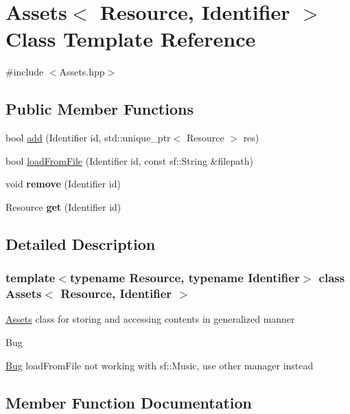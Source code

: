\hypertarget{class_assets}{}\section{Assets$<$ Resource, Identifier $>$ Class Template Reference}
\label{class_assets}


{\ttfamily \#include $<$Assets.\+hpp$>$}

\subsection*{Public Member Functions}
\begin{DoxyCompactItemize}
\item 
bool \hyperlink{class_assets_a4f68c4062a79168c95daf5189a0fc66d}{add} (Identifier id, std\+::unique\+\_\+ptr$<$ Resource $>$ res)
\item 
bool \hyperlink{class_assets_a49e8d7a2a71566ce3ec1186666274a9a}{load\+From\+File} (Identifier id, const sf\+::\+String \&filepath)
\item 
\mbox{\label{class_assets_a89254b23f0e1477aae4bbb99d76e85cb}} 
void {\bfseries remove} (Identifier id)
\item 
\mbox{\label{class_assets_a02f50a66b90b8c154d1613be25fdfe43}} 
Resource {\bfseries get} (Identifier id)
\end{DoxyCompactItemize}


\subsection{Detailed Description}
\subsubsection*{template$<$typename Resource, typename Identifier$>$\newline
class Assets$<$ Resource, Identifier $>$}

\hyperlink{class_assets}{Assets} class for storing and accessing contents in generalized manner \begin{DoxyRefDesc}{Bug}
\item[\hyperlink{bug__bug000001}{Bug}]load\+From\+File not working with sf\+::\+Music, use other manager instead \end{DoxyRefDesc}


\subsection{Member Function Documentation}
\mbox{\label{class_assets_a4f68c4062a79168c95daf5189a0fc66d}} 
